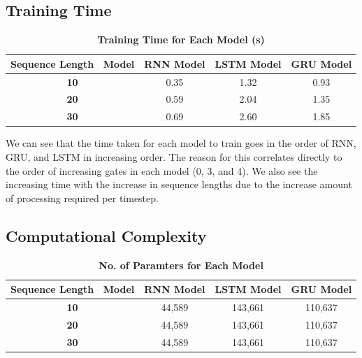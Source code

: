 \documentclass[a4paper]{article}
\begin{document}
\subsection*{\textbf{Training Time}}

\begin{table}[H]
    \centering
    \caption{\textbf{Training Time for Each Model (s)}}
    \label{tab:trainTime}
    \begin{tabular}{| c | c | c | c |}
        \hline
        Sequence Length \ Model & \textbf{RNN Model} & \textbf{LSTM Model} & \textbf{GRU Model} \\
        \hline
        \textbf{10} & 0.35 & 1.32 & 0.93 \\
        \hline
        \textbf{20} & 0.59 & 2.04 & 1.35 \\
        \hline
        \textbf{30} & 0.69 & 2.60 & 1.85 \\
        \hline
    \end{tabular}
\end{table}

We can see that the time taken for each model to train goes in the order of RNN, GRU, and LSTM in increasing order. The reason for this correlates directly to the order of increasing gates in each model (0, 3, and 4). We also see the increasing time with the increase in sequence lengths  due to the increase amount of processing required per timestep.

\subsection*{\textbf{Computational Complexity}}

\begin{table}[H]
    \centering
    \caption{\textbf{No. of Paramters for Each Model}}
    \label{tab:paramCount}
    \begin{tabular}{| c | c | c | c |}
        \hline
        Sequence Length \ Model & \textbf{RNN Model} & \textbf{LSTM Model} & \textbf{GRU Model} \\
        \hline
        \textbf{10} & 44,589 & 143,661 & 110,637 \\
        \hline
        \textbf{20} & 44,589 & 143,661 & 110,637 \\
        \hline
        \textbf{30} & 44,589 & 143,661 & 110,637 \\
        \hline
    \end{tabular}
\end{table}\
\end{document}
